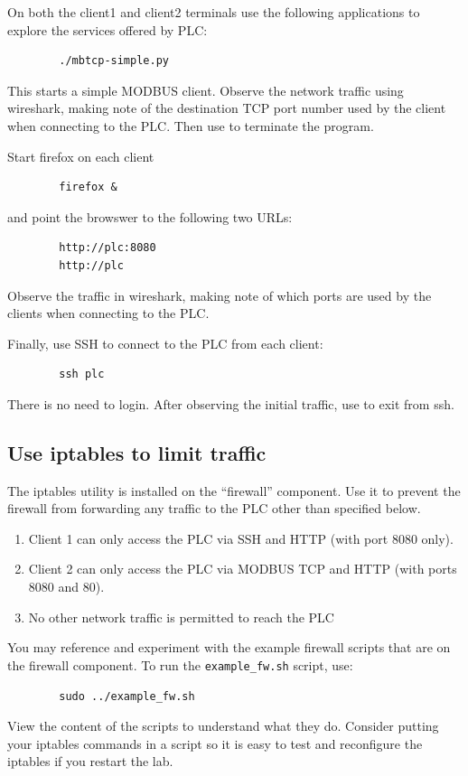 On both the client1 and client2 terminals use the following applications
to explore the services offered by PLC:

\begin{verbatim}
        ./mbtcp-simple.py
\end{verbatim}
This starts a simple MODBUS client.  Observe the network traffic using
wireshark, making note of the destination TCP port number used by the client when
connecting to the PLC. Then use {\tt <ctrl C>} to terminate the program.

\noindent Start firefox on each client 
\begin{verbatim}
        firefox &
\end{verbatim}
\noindent and point the browswer to the following two URLs:
\begin{verbatim}
        http://plc:8080
        http://plc
\end{verbatim}
\noindent Observe the traffic in wireshark, making note of which ports are used by the 
clients when connecting to the PLC.

\noindent Finally, use SSH to connect to the PLC from each client:
\begin{verbatim}
        ssh plc
\end{verbatim}
\noindent There is no need to login.  After observing the initial traffic,
use {\tt <ctrl C>} to exit from ssh.

\subsection{Use iptables to limit traffic}
The iptables utility is installed on the ``firewall'' component.
Use it to prevent the firewall from forwarding any traffic
to the PLC other than specified below.

\begin{enumerate}
\item Client 1 can only access the PLC via SSH and HTTP 
(with port 8080 only).
\item Client 2 can only access the PLC via MODBUS TCP and HTTP 
(with ports 8080 and 80).
\item No other network traffic is permitted to reach the PLC
\end{enumerate}

You may reference and experiment with the example firewall scripts that
are on the firewall component.  To run the {\tt example\_fw.sh} script, use:
\begin{verbatim}
        sudo ../example_fw.sh
\end{verbatim}
View the content of the scripts to understand what they do.
Consider putting your iptables commands in a script so it is easy
to test and reconfigure the iptables if you restart the lab.

